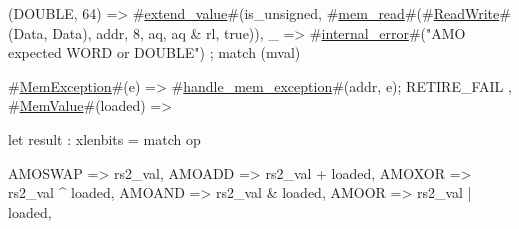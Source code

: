 {{{{{{{{                (DOUBLE, 64) => #\hyperref[sailRISCVzextendzyvalue]{extend\_value}#(is_unsigned, #\hyperref[sailRISCVzmemzyread]{mem\_read}#(#\hyperref[sailRISCVzReadWrite]{ReadWrite}#(Data, Data), addr, 8, aq, aq & rl, true)),
                _            => #\hyperref[sailRISCVzinternalzyerror]{internal\_error}#("AMO expected WORD or DOUBLE")
              };
              match (mval) {
                #\hyperref[sailRISCVzMemException]{MemException}#(e)  => { #\hyperref[sailRISCVzhandlezymemzyexception]{handle\_mem\_exception}#(addr, e); RETIRE_FAIL },
                #\hyperref[sailRISCVzMemValue]{MemValue}#(loaded) => {
                  let result : xlenbits =
                    match op {
                      AMOSWAP => rs2_val,
                      AMOADD  => rs2_val + loaded,
                      AMOXOR  => rs2_val ^ loaded,
                      AMOAND  => rs2_val & loaded,
                      AMOOR   => rs2_val | loaded,

}}}}}}}}}}
